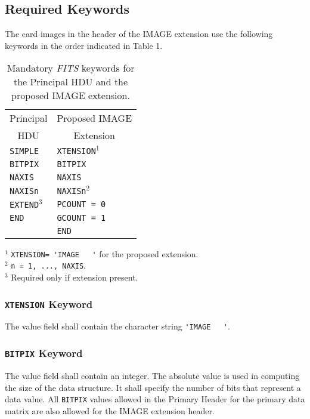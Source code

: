 \subsection{Required Keywords}
The card images in the header of the IMAGE extension use the following
keywords in the order indicated in Table 1.

{\small
\begin{table}[htpb]
\begin{center}
\begin{tabular}{ll} \\
\multicolumn{1}{c}{Principal}  & \multicolumn{1}{c}{Proposed IMAGE} \\
\multicolumn{1}{c}{HDU}        & \multicolumn{1}{c}{Extension}      \\ \hline
{\tt SIMPLE}      & {\tt XTENSION}$^{1}$ \\
{\tt BITPIX}      & {\tt BITPIX}         \\
{\tt NAXIS}       & {\tt NAXIS}          \\
{\tt NAXISn}      & {\tt NAXISn}$^{2}$   \\
{\tt EXTEND}$^{3}$& {\tt PCOUNT = 0}     \\
{\tt END}         & {\tt GCOUNT = 1}     \\
                  & {\tt END}            \\
\hline
\end{tabular}
\end{center}
$^1$  \verb*+XTENSION= 'IMAGE   '+ for the proposed extension.\\
$^2$  {\tt n = 1, ..., NAXIS}.\\
$^3$  Required only if extension present.

\caption[Mandatory {\em FITS} keywords]                                        
         {Mandatory {\em FITS} keywords for the Principal HDU and the
          proposed IMAGE extension.}
\end{table}              
}

\subsubsection{{\tt XTENSION} Keyword}
The value field shall contain the character string \verb*+'IMAGE   '+.

\subsubsection{{\tt BITPIX} Keyword}
The value field shall contain an integer. The absolute value is used in 
computing the size of the data structure. 
It shall specify the number of bits that represent a data value.
All {\tt BITPIX} values allowed in the Primary Header for the primary 
data matrix are also allowed for the IMAGE extension header.

